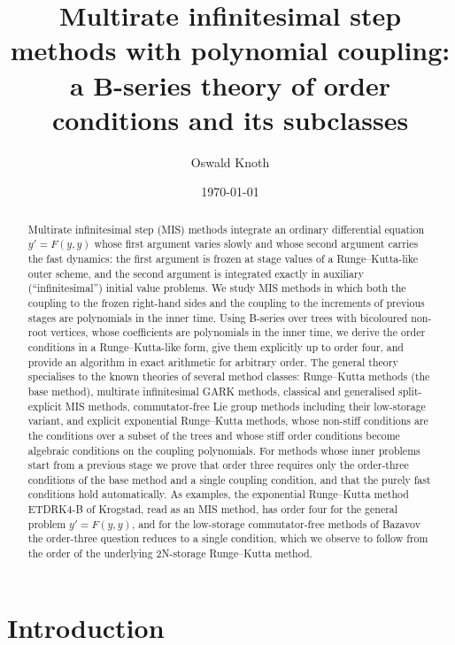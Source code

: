 \documentclass[11pt,a4paper]{article}
\title{Multirate infinitesimal step methods with polynomial coupling:\\
a B-series theory of order conditions and its subclasses}
\author{Oswald Knoth}
\date{\today}
\theoremstyle{definition}
\theoremstyle{remark}
\begin{document}
\maketitle

\begin{abstract}
Multirate infinitesimal step (MIS) methods integrate an ordinary differential equation $y'=F(y,y)$ whose first argument
varies slowly and whose second argument carries the fast dynamics: the first argument is frozen at stage values of a
Runge--Kutta-like outer scheme, and the second argument is integrated exactly in auxiliary (``infinitesimal'') initial
value problems. We study MIS methods in which both the coupling to the frozen right-hand sides and the coupling to the
increments of previous stages are polynomials in the inner time. Using B-series over trees with bicoloured non-root
vertices, whose coefficients are polynomials in the inner time, we derive the order conditions in a Runge--Kutta-like
form, give them explicitly up to order four, and provide an algorithm in exact arithmetic for arbitrary order. The
general theory specialises to the known theories of several method classes: Runge--Kutta methods (the base method),
multirate infinitesimal GARK methods, classical and generalised split-explicit MIS methods, commutator-free Lie group
methods including their low-storage variant, and explicit exponential Runge--Kutta methods, whose non-stiff conditions are the conditions over a subset of the trees and whose stiff order
conditions become algebraic conditions on the coupling polynomials. For methods whose inner problems start from a
previous stage we prove that order three requires only the order-three conditions of the base method and a single
coupling condition, and that the purely fast conditions hold automatically. As examples, the exponential
Runge--Kutta method ETDRK4-B of Krogstad, read as an MIS method, has order four for the general problem $y'=F(y,y)$, and
for the low-storage commutator-free methods of Bazavov the order-three question reduces to a single condition, which we
observe to follow from the order of the underlying 2N-storage Runge--Kutta method.
\end{abstract}

\tableofcontents

\section{Introduction}
\label{sec:intro}
\end{document}
